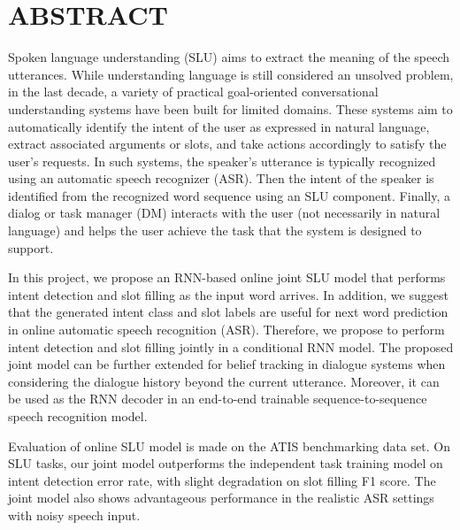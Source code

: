 \chapter*{ABSTRACT}

Spoken language understanding (SLU) aims to extract the meaning
of the speech utterances. While understanding language is still considered
an unsolved problem, in the last decade, a variety of practical
goal-oriented conversational understanding systems have been built
for limited domains. These systems aim to automatically identify the
intent of the user as expressed in natural language, extract associated
arguments or slots, and take actions accordingly to satisfy the user’s
requests. In such systems, the speaker’s utterance is typically recognized
using an automatic speech recognizer (ASR). Then the intent
of the speaker is identified from the recognized word sequence using
an SLU component. Finally, a dialog or task manager (DM) interacts
with the user (not necessarily in natural language) and helps the
user achieve the task that the system is designed to support.
\par
In this project, we propose an RNN-based online joint SLU model that performs intent detection
and slot filling as the input word arrives. In addition, we suggest that the generated intent class and slot labels are useful for next word prediction in online automatic speech recognition (ASR). Therefore, we propose to perform intent detection and slot filling jointly in a conditional RNN model. The proposed joint model can be further extended for belief tracking
in dialogue systems when considering the dialogue history beyond the current utterance. Moreover,
it can be used as the RNN decoder in an end-to-end trainable sequence-to-sequence speech
recognition model.
\par
Evaluation of online SLU model is made on the ATIS benchmarking data set. On SLU
tasks, our joint model outperforms the independent task training model 
on intent detection error rate, with slight degradation on slot filling F1 score. The
joint model also shows advantageous performance in the realistic ASR settings with
noisy speech input.

